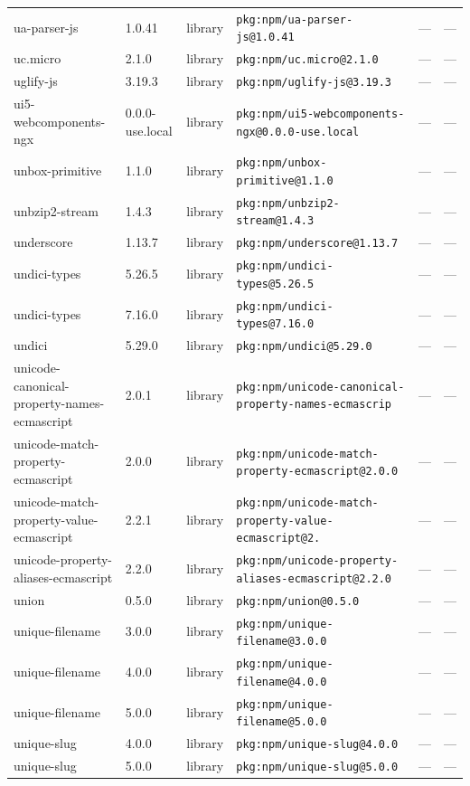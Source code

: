 \documentclass[11pt]{article}
\begin{document}
\begin{longtable}{|l|l|l|p{2.2cm}|l|p{4cm}|}
ua-parser-js & 1.0.41 & library & \texttt{pkg:npm/ua-parser-js@1.0.41} & — & — \\
uc.micro & 2.1.0 & library & \texttt{pkg:npm/uc.micro@2.1.0} & — & — \\
uglify-js & 3.19.3 & library & \texttt{pkg:npm/uglify-js@3.19.3} & — & — \\
ui5-webcomponents-ngx & 0.0.0-use.local & library & \texttt{pkg:npm/ui5-webcomponents-ngx@0.0.0-use.local} & — & — \\
unbox-primitive & 1.1.0 & library & \texttt{pkg:npm/unbox-primitive@1.1.0} & — & — \\
unbzip2-stream & 1.4.3 & library & \texttt{pkg:npm/unbzip2-stream@1.4.3} & — & — \\
underscore & 1.13.7 & library & \texttt{pkg:npm/underscore@1.13.7} & — & — \\
undici-types & 5.26.5 & library & \texttt{pkg:npm/undici-types@5.26.5} & — & — \\
undici-types & 7.16.0 & library & \texttt{pkg:npm/undici-types@7.16.0} & — & — \\
undici & 5.29.0 & library & \texttt{pkg:npm/undici@5.29.0} & — & — \\
unicode-canonical-property-names-ecmascript & 2.0.1 & library & \texttt{pkg:npm/unicode-canonical-property-names-ecmascrip} & — & — \\
unicode-match-property-ecmascript & 2.0.0 & library & \texttt{pkg:npm/unicode-match-property-ecmascript@2.0.0} & — & — \\
unicode-match-property-value-ecmascript & 2.2.1 & library & \texttt{pkg:npm/unicode-match-property-value-ecmascript@2.} & — & — \\
unicode-property-aliases-ecmascript & 2.2.0 & library & \texttt{pkg:npm/unicode-property-aliases-ecmascript@2.2.0} & — & — \\
union & 0.5.0 & library & \texttt{pkg:npm/union@0.5.0} & — & — \\
unique-filename & 3.0.0 & library & \texttt{pkg:npm/unique-filename@3.0.0} & — & — \\
unique-filename & 4.0.0 & library & \texttt{pkg:npm/unique-filename@4.0.0} & — & — \\
unique-filename & 5.0.0 & library & \texttt{pkg:npm/unique-filename@5.0.0} & — & — \\
unique-slug & 4.0.0 & library & \texttt{pkg:npm/unique-slug@4.0.0} & — & — \\
unique-slug & 5.0.0 & library & \texttt{pkg:npm/unique-slug@5.0.0} & — & — \\

\end{longtable}
\end{document}
